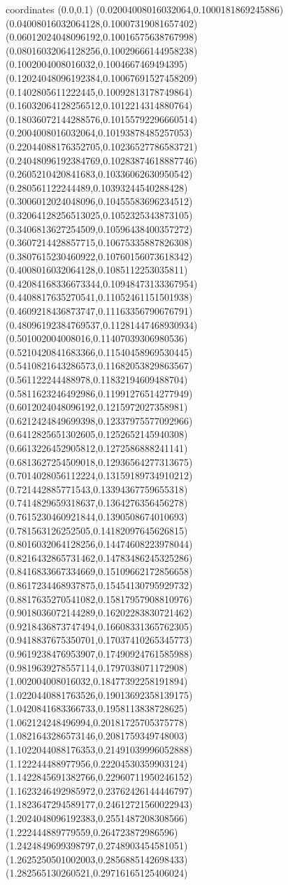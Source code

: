 coordinates {%
(0.0,0.1)
(0.02004008016032064,0.1000181869245886)
(0.04008016032064128,0.10007319081657402)
(0.06012024048096192,0.10016575638767998)
(0.08016032064128256,0.10029666144958238)
(0.1002004008016032,0.1004667469494395)
(0.12024048096192384,0.10067691527458209)
(0.1402805611222445,0.10092813178749864)
(0.16032064128256512,0.1012214314880764)
(0.18036072144288576,0.10155792296660514)
(0.2004008016032064,0.10193878485257053)
(0.22044088176352705,0.10236527786583721)
(0.24048096192384769,0.10283874618887746)
(0.2605210420841683,0.10336062630950542)
(0.280561122244489,0.10393244540288428)
(0.3006012024048096,0.10455583696234512)
(0.32064128256513025,0.1052325343873105)
(0.3406813627254509,0.10596438400357272)
(0.3607214428857715,0.10675335887826308)
(0.3807615230460922,0.10760156073618342)
(0.4008016032064128,0.1085112253035811)
(0.42084168336673344,0.10948473133367954)
(0.4408817635270541,0.11052461151501938)
(0.4609218436873747,0.11163356790676791)
(0.48096192384769537,0.11281447468930934)
(0.501002004008016,0.11407039306980536)
(0.5210420841683366,0.11540458969530445)
(0.5410821643286573,0.11682053829863567)
(0.561122244488978,0.11832194609488704)
(0.5811623246492986,0.11991276514277949)
(0.6012024048096192,0.1215972027358981)
(0.6212424849699398,0.12337975577092966)
(0.6412825651302605,0.1252652145940308)
(0.6613226452905812,0.1272586888241141)
(0.6813627254509018,0.12936564277313675)
(0.7014028056112224,0.13159189734910212)
(0.721442885771543,0.13394367759655318)
(0.7414829659318637,0.1364276356456278)
(0.7615230460921844,0.1390508674010693)
(0.781563126252505,0.14182097645626815)
(0.8016032064128256,0.14474608223978044)
(0.8216432865731462,0.14783486245325286)
(0.8416833667334669,0.15109662172856658)
(0.8617234468937875,0.15454130795929732)
(0.8817635270541082,0.15817957908810976)
(0.9018036072144289,0.16202283830721462)
(0.9218436873747494,0.16608331365762305)
(0.9418837675350701,0.17037410265345773)
(0.9619238476953907,0.17490924761585988)
(0.9819639278557114,0.1797038071172908)
(1.002004008016032,0.18477392258191894)
(1.0220440881763526,0.19013692358139175)
(1.0420841683366733,0.1958113838728625)
(1.062124248496994,0.20181725705375778)
(1.0821643286573146,0.2081759349748003)
(1.1022044088176353,0.21491039996052888)
(1.122244488977956,0.22204530359903124)
(1.1422845691382766,0.22960711950246152)
(1.1623246492985972,0.23762426144446797)
(1.1823647294589177,0.24612721560022943)
(1.2024048096192383,0.2551487208308566)
(1.222444889779559,0.264723872986596)
(1.2424849699398797,0.2748903454581051)
(1.2625250501002003,0.2856885142698433)
(1.282565130260521,0.29716165125406024)
}
